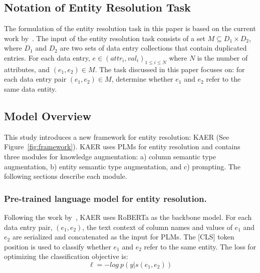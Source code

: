 


\subsection{Notation of Entity Resolution Task}
The formulation of the entity resolution task in this paper is based on the current work by~\citet{li_deep_2020}. The input of the entity resolution task consists of a set $M \subseteq D_1 \times D_2$, where $D_1$ and $D_2$ are two sets of data entry collections that contain duplicated entries.  
For each data entry, $e \in {(attr_i, val_i)}_{1 \leq i \leq N}$ where $N$ is the number of attributes, and $(e_1, e_2) \in M$. The task discussed in this paper focuses on: for each data entry pair $(e_1, e_2) \in M$, determine whether $e_1$ and $e_2$ refer to the same data entity.

\subsection{Model Overview}
This study introduces a new framework for entity resolution: KAER (See Figure~\ref{fig:framework}). 
KAER uses PLMs for entity resolution and contains three modules for knowledge augmentation: a) column semantic type augmentation, b) entity semantic type augmentation, and c) prompting. 
The following sections describe each module.


\subsubsection{Pre-trained language model for entity resolution.}
Following the work by~\citet{li_deep_2020}, KAER uses RoBERTa as the backbone model. For each data entry pair, $(e_1, e_2)$, 
 the text context of column names and values of $e_1$ and $e_2$ are serialized and concatenated as the input for PLMs. The [CLS] token position is used to classify whether $e_1$ and $e_2$ refer to the same entity. 
The loss for optimizing the classification objective is:
\begin{equation}
    \ell = - log\ p(y | s(e_1, e_2))
\end{equation}

